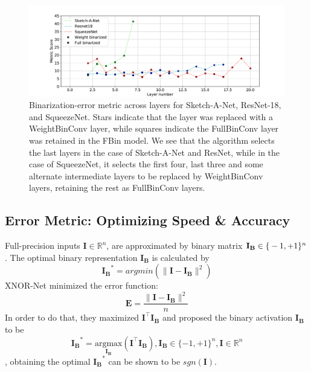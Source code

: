\begin{figure}[t]
\centering
\includegraphics[width=1.0\columnwidth]{figures/metric.pdf}
\caption{Binarization-error metric across layers for Sketch-A-Net, ResNet-18, and SqueezeNet. Stars indicate that the layer was replaced with a WeightBinConv layer, while squares indicate the FullBinConv layer was retained in the FBin model. We see that the algorithm selects the last layers in the case of Sketch-A-Net and ResNet, while in the case of SqueezeNet, it selects the first four, last three and some alternate intermediate layers to be replaced by WeightBinConv layers, retaining the rest  as FullBinConv layers.}
\label{fig:metric}
\end{figure}

\subsection{Error Metric: Optimizing Speed \& Accuracy}
\noindent Full-precision inputs $\mathbf{I} \in \mathbb{R}^n$, are approximated by binary matrix $\mathbf{I_B} \in \mathbb\{-1,+1\}^n$. The optimal binary representation $\mathbf{I_B}$ is calculated by
\begin{equation}\mathbf{I_B}^\ast  = argmin(\parallel\mathbf{I}-\mathbf{I_B}\parallel^2)\end{equation}
XNOR-Net\cite{rastegari2016xnor} minimized the error function:
\begin{equation} \mathbf{E} = \frac{\parallel \mathbf{I} - \mathbf{I_B} \parallel^2}{n}\end{equation}
In order to do that, they maximized $\mathbf{I}^\top\mathbf{I_B}$ and proposed the binary activation $\mathbf{I_B}$ to be 
\begin{equation}\mathbf{I_B}^\ast = \underset{\mathbf{\mathbf{I_B}}}{\mathrm{argmax}}(\mathbf{I}^\top\mathbf{I_B}), \mathbf{I_B} \in \{-1,+1\}^n , \mathbf{I} \in \mathbb{R}^n \end{equation}, obtaining the optimal $\mathbf{I_B}^\ast$ can be shown to be  $sgn(\mathbf{I}).$\\ 

